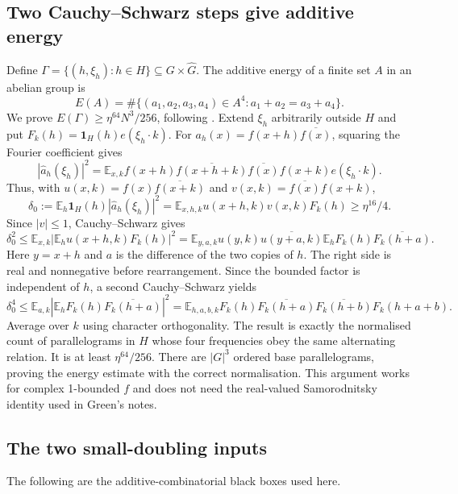 \documentclass[11pt,a4paper]{article}
\newcommand{\E}{\mathbb E}
\newcommand{\Gh}{\widehat G}
\newcommand{\abs}[1]{\left|#1\right|}
\newcommand{\GT}[1]{\cite[#1]{GT}}
\theoremstyle{definition}
\numberwithin{equation}{section}
\begin{document}
\subsection{Two Cauchy--Schwarz steps give additive energy}
Define $\Gamma=\{(h,\xi_h):h\in H\}\subseteq G\times\Gh$.
The additive energy of a finite set $A$ in an abelian group is
\[
E(A)=\#\{(a_1,a_2,a_3,a_4)\in A^4:a_1+a_2=a_3+a_4\}.
\]
We prove $E(\Gamma)\geq\eta^{64}N^3/256$, following
\GT{Proposition 5.1}.
Extend $\xi_h$ arbitrarily outside $H$ and put $F_k(h)=\mathbf1_H(h)e(\xi_h\cdot k)$.
For $a_h(x)=f(x+h)\overline{f(x)}$, squaring the Fourier coefficient gives
\[
|\widehat a_h(\xi_h)|^2
=\E_{x,k}f(x+h)\overline{f(x+h+k)}\overline{f(x)}f(x+k)e(\xi_h\cdot k).
\]
Thus, with $u(x,k)=f(x)\overline{f(x+k)}$ and
$v(x,k)=\overline{f(x)}f(x+k)$,
\[
\delta_0:=\E_h\mathbf1_H(h)|\widehat a_h(\xi_h)|^2
=\E_{x,h,k}u(x+h,k)v(x,k)F_k(h)\geq\eta^{16}/4.
\]
Since $|v|\leq1$, Cauchy--Schwarz gives
\[
\delta_0^2\leq
\E_{x,k}\abs{\E_hu(x+h,k)F_k(h)}^2
=\E_{y,a,k}u(y,k)\overline{u(y+a,k)}
       \E_hF_k(h)\overline{F_k(h+a)}.
\]
Here $y=x+h$ and $a$ is the difference of the two copies of $h$.
The right side is real and nonnegative before rearrangement. Since the
bounded factor is independent of $h$, a second Cauchy--Schwarz yields
\[
\delta_0^4\leq
\E_{a,k}\abs{\E_hF_k(h)\overline{F_k(h+a)}}^2
=\E_{h,a,b,k}F_k(h)\overline{F_k(h+a)}
                  \overline{F_k(h+b)}F_k(h+a+b).
\]
Average over $k$ using character orthogonality. The result is exactly the
normalised count of parallelograms in $H$ whose four frequencies obey the
same alternating relation. It is at least $\eta^{64}/256$. There are
$|G|^3$ ordered base parallelograms, proving the energy estimate with the
correct normalisation. This argument works for complex 1-bounded $f$ and
does not need the real-valued Samorodnitsky identity used in Green's notes.

\subsection{The two small-doubling inputs}
The following are the additive-combinatorial black boxes used here.
\end{document}
